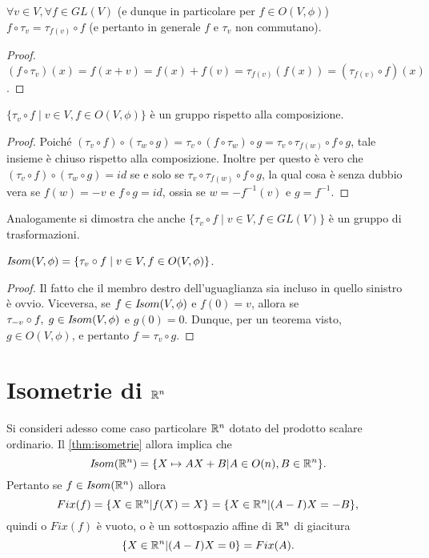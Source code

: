  \begin{lemma}
 $\forall v\in V, \forall f\in GL(V)$ (e dunque in particolare per 
 $f\in O(V,\phi)$) $f\circ\tau_v=\tau_{f(v)}\circ f$ (e pertanto in generale $f$ e $\tau_v$ non commutano).
 \end{lemma}
 
 \begin{proof}
 $(f\circ\tau_v)(x)=f(x+v)=f(x)+f(v)=\tau_{f(v)}(f(x))=(\tau_{f(v)}\circ f)(x)$.
  \end{proof}
 
 \begin{proposition}
 $\{\tau_v\circ f\;|\;v\in V,f\in O(V,\phi)\}$ è un gruppo rispetto alla composizione.
 \end{proposition}
 
 \begin{proof}
 Poiché  $(\tau_v\circ f)\circ(\tau_w\circ g)=\tau_v\circ(f\circ\tau_w)\circ g=
 \tau_v\circ\tau_{f(w)}\circ f\circ g$, tale insieme è chiuso rispetto alla composizione.
 Inoltre per questo è vero che $(\tau_v\circ f)\circ(\tau_w\circ g)=id$ se e solo se $\tau_v\circ\tau_{f(w)}\circ f\circ g$,
 la qual cosa è senza dubbio vera se $f(w)=-v$  e  $f\circ g=id$, ossia se $w=-f^{-1}(v)$  e 
 $g=f^{-1}$.
  \end{proof}
 
 \begin{remark}
 Analogamente si dimostra che anche $\{\tau_v\circ f\;|\;v\in V,f\in GL(V)\}$ 
 è un gruppo di trasformazioni.
 \end{remark}
 
 \begin{theorem}
 \label{thm:isometrie}
 $I\!som( V,\phi)=\{\tau_v\circ f\;|\;v\in V,f\in O(V,\phi)\}$.
 \end{theorem}
 
 \begin{proof}
 Il fatto che il membro destro dell'uguaglianza sia incluso in quello sinistro è ovvio.
 Viceversa, se $f\in I\!som( V,\phi)$  e  $f(0)=v$, allora se  $\tau_{-v}\circ f,\; g\in I\!som( V,\phi)$ e
 $g(0)=0$. Dunque, per un teorema visto, $g\in O(V,\phi)$, e pertanto $f=\tau_v\circ g$.
  \end{proof}
 

 
\section{Isometrie di $\mathbb R^n$}
 
 Si consideri adesso come caso particolare $\mathbb R^n$ dotato del prodotto scalare ordinario.
 Il \cref{thm:isometrie} allora implica che
 \[
	I\!som( \mathbb R^n)=\{X\mapsto AX+B|A\in O(n),B\in \mathbb R^n\}.
 \]
 Pertanto se $f\in I\!som( \mathbb R^n)$ allora
 \[
	Fix(f)=\{X\in \mathbb R^n|f(X)=X\}=\{X\in \mathbb R^n|(A-I)X=-B\},
 \]
 quindi o $Fix(f)$ è vuoto, o è un sottospazio affine di $\mathbb R^n$ di giacitura
 \[
	\{X\in \mathbb R^n|(A-I)X=0\}=Fix(A).
 \]
 
